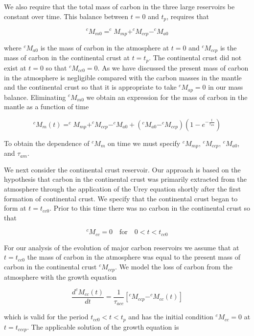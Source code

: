 {We also require that the total mass of carbon in the three large reservoirs be constant over time. This balance between $t=0$ and $t_p$, requires that

\begin{equation}
  ^cM_{m0} = ^cM_{mp} + ^cM_{ccp} - ^cM_{a0}
\end{equation}

where $^cM_{a0}$ is the mass of carbon in the atmosphere at $t=0$ and $^cM_{ccp}$ is the mass of carbon in the continental crust at $t=t_p$. The continental crust did not exist at $t=0$ so that $^cM_{cc0}=0$. As we have discussed the present mass of carbon in the atmosphere is negligible compared with the carbon masses in the mantle and the continental crust so that it is appropriate to take $^cM_{ap}=0$ in our mass balance. Eliminating $^cM_{m0}$ we obtain an expression for the mass of carbon in the mantle as a function of time

\begin{equation}
  ^cM_{m}(t) = ^cM_{mp} + ^cM_{ccp} - ^cM_{a0} + (^cM_{a0} - ^cM_{ccp}) (1 - e^{-\frac{t}{\tau_{am}}})
\end{equation}

To obtain the dependence of $^cM_{m}$ on time we must specify $^cM_{mp}$, $^cM_{ccp}$, $^cM_{a0}$, and $\tau_{am}$.


We next consider the continental crust reservoir. Our approach is based on the hypothesis that carbon in the continental crust was primarily extracted from the atmosphere through the application of the Urey equation shortly after the first formation of continental crust. We specify that the continental crust began to form at $t=t_{cc0}$. Prior to this time there was no carbon in the continental crust so that

\begin{equation}
  ^cM_{cc} = 0 \quad \text{for} \quad 0 < t < t_{cc0}
\end{equation}

For our analysis of the evolution of major carbon reservoirs we assume that at $t=t_{cc0}$ the mass of carbon in the atmosphere was equal to the present mass of carbon in the continental crust $^cM_{ccp}$. We model the loss of carbon from the atmosphere with the growth equation

\begin{equation}
    \frac{d ^cM_{cc}(t)}{d t} = \frac{1}{\tau_{acc}} [^cM_{ccp} - ^cM_{cc}(t)]
\end{equation}

which is valid for the period $t_{cc0} < t < t_p$ and has the initial condition $^cM_{cc} = 0$ at $t = t_{cccp}$. The applicable solution of the growth equation is

}
